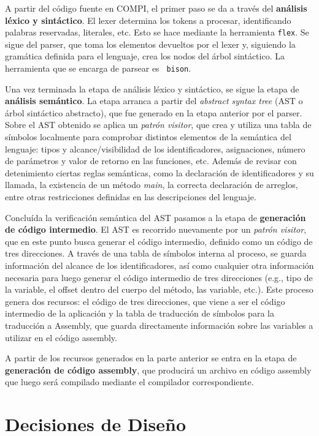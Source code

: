\documentclass[12pt, a4paper, titlepage]{article}
\begin{document}
  A partir del código fuente en COMPI, el primer paso se da a través del {\bf
  análisis léxico y sintáctico}. El lexer determina los tokens a procesar,
  identificando palabras reservadas, literales, etc. Esto se hace mediante la
  herramienta {\tt flex}. Se sigue del parser, que toma los elementos devueltos
  por el lexer y, siguiendo la gramática definida para el lenguaje, crea los
  nodos del árbol sintáctico. La herramienta que se encarga de parsear es {\tt
  bison}.

  Una vez terminada la etapa de análisis léxico y sintáctico, se sigue la etapa
  de {\bf análisis semántico}. La etapa arranca a partir del {\em abstract
  syntax tree} (AST o árbol sintáctico abstracto), que fue generado en la etapa
  anterior por el parser. Sobre el AST obtenido se aplica un {\em patrón
  visitor}, que crea y utiliza una tabla de símbolos localmente para comprobar
  distintos elementos de la semántica del lenguaje: tipos y alcance/visibilidad
  de los identificadores, asignaciones, número de parámetros y valor de retorno
  en las funciones, etc. Además de revisar con detenimiento ciertas reglas
  semánticas, como la declaración de identificadores y su llamada, la existencia
  de un método {\em main}, la correcta declaración de arreglos, entre otras
  restricciones definidas en las descripciones del lenguaje.

  Concluída la verificación semántica del AST pasamos a la etapa de {\bf
  generación de código intermedio}. El AST es recorrido nuevamente por un {\em
  patrón visitor}, que en este punto busca generar el código intermedio,
  definido como un código de tres direcciones. A través de una tabla de símbolos
  interna al proceso, se guarda información del alcance de los identificadores,
  así como cualquier otra información necesaria para luego generar el código
  intermedio de tres direcciones (e.g., tipo de la variable, el offset dentro
  del cuerpo del método, las variable, etc.). Este proceso genera dos recursos:
  el código de tres direcciones, que viene a ser el código intermedio de la
  aplicación y la tabla de traducción de símbolos para la traducción a Assembly,
  que guarda directamente información sobre las variables a utilizar en el
  código assembly.

  A partir de los recursos generados en la parte anterior se entra en la etapa
  de {\bf generación de código assembly}, que producirá un archivo en código
  assembly que luego será compilado mediante el compilador correspondiente.

  \section{Decisiones de Diseño}\label{sec:design}
\end{document}
